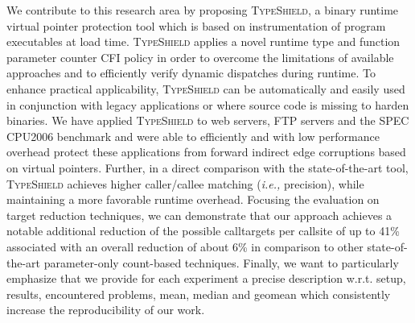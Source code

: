 We contribute to this research area by proposing \textsc{TypeShield}, a binary runtime virtual pointer protection tool 
which is based on instrumentation of program executables at load time. \textsc{TypeShield} applies a novel runtime 
type and function parameter counter CFI policy in order to overcome the limitations of available approaches and to 
efficiently verify dynamic dispatches during runtime. To enhance practical applicability, \textsc{TypeShield} can 
be automatically and easily used in conjunction with legacy applications or where source code is missing to harden 
binaries.
We have applied \textsc{TypeShield} to web servers, FTP servers and the SPEC CPU2006 benchmark and were able to 
efficiently and with low performance overhead protect these applications from forward indirect edge corruptions 
based on virtual pointers. Further, in a direct comparison with the state-of-the-art tool, \textsc{TypeShield} 
achieves higher caller/callee matching (\textit{i.e.,} precision), while maintaining a more favorable runtime overhead. 
Focusing the evaluation on target reduction techniques, we can demonstrate that our approach achieves a notable 
additional reduction of the possible calltargets per callsite of up to 41\% associated with an overall reduction
of about 6\% in comparison to other state-of-the-art parameter-only count-based techniques.
Finally, we want to particularly emphasize that we provide for each experiment a precise description
w.r.t. setup, results, encountered problems, mean, median and geomean which consistently increase
the reproducibility of our work.